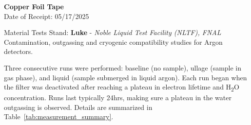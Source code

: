\documentclass[12pt]{article}
\begin{document}
\begin{center}
    \LARGE \textbf{ Copper Foil Tape } \\
    \large Date of Receipt: 05/17/2025
\end{center}

\begin{center}
    \large Material Tests Stand: \textbf{Luke} - \textit{Noble Liquid Test Facility (NLTF), FNAL} \\
    \small Contamination, outgassing and cryogenic compatibility studies for Argon detectors.
\end{center}


\begin{table}[H]
    \centering
    \caption*{\textbf{Sample Information}}
\end{table}

Three consecutive runs were performed: baseline (no sample), ullage (sample in gas phase), and liquid (sample submerged in liquid argon). Each run began when the filter was deactivated after reaching a plateau in electron lifetime and H\textsubscript{2}O concentration. Runs last typically 24hrs, making sure a plateau in the water outgassing is observed. Details are summarized in Table~\ref{tab:measurement_summary}.
\end{document}
